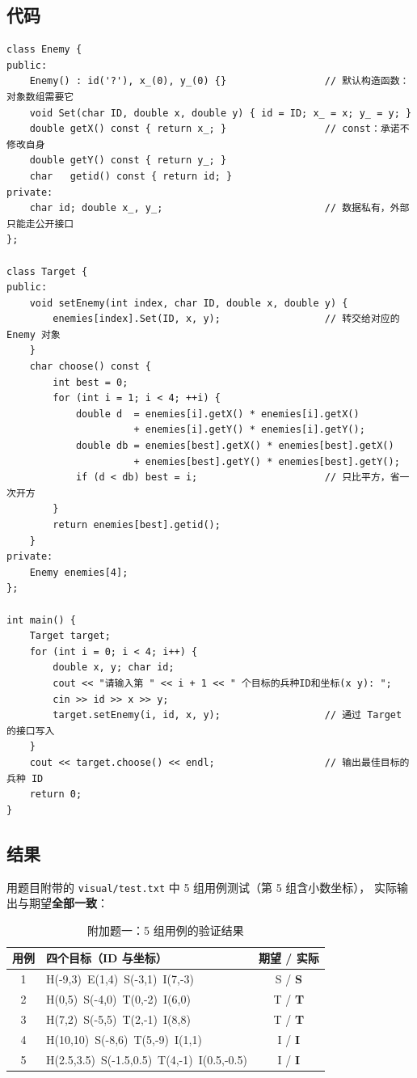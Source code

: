 \subsection{代码}
\begin{lstlisting}
class Enemy {
public:
    Enemy() : id('?'), x_(0), y_(0) {}                 // 默认构造函数：对象数组需要它
    void Set(char ID, double x, double y) { id = ID; x_ = x; y_ = y; }
    double getX() const { return x_; }                 // const：承诺不修改自身
    double getY() const { return y_; }
    char   getid() const { return id; }
private:
    char id; double x_, y_;                            // 数据私有，外部只能走公开接口
};

class Target {
public:
    void setEnemy(int index, char ID, double x, double y) {
        enemies[index].Set(ID, x, y);                  // 转交给对应的 Enemy 对象
    }
    char choose() const {
        int best = 0;
        for (int i = 1; i < 4; ++i) {
            double d  = enemies[i].getX() * enemies[i].getX()
                      + enemies[i].getY() * enemies[i].getY();
            double db = enemies[best].getX() * enemies[best].getX()
                      + enemies[best].getY() * enemies[best].getY();
            if (d < db) best = i;                      // 只比平方，省一次开方
        }
        return enemies[best].getid();
    }
private:
    Enemy enemies[4];
};

int main() {
    Target target;
    for (int i = 0; i < 4; i++) {
        double x, y; char id;
        cout << "请输入第 " << i + 1 << " 个目标的兵种ID和坐标(x y): ";
        cin >> id >> x >> y;
        target.setEnemy(i, id, x, y);                  // 通过 Target 的接口写入
    }
    cout << target.choose() << endl;                   // 输出最佳目标的兵种 ID
    return 0;
}
\end{lstlisting}

\subsection{结果}
用题目附带的 \texttt{visual/test.txt} 中 5 组用例测试（第 5 组含小数坐标），
实际输出与期望\textbf{全部一致}：

\begin{table}[h]\centering
  \caption{附加题一：5 组用例的验证结果}
  \begin{tabular}{clc}
    \toprule
    用例 & 四个目标（ID 与坐标） & 期望 / 实际 \\
    \midrule
    1 & H(-9,3)\ E(1,4)\ S(-3,1)\ I(7,-3) & S / \textbf{S} \\
    2 & H(0,5)\ S(-4,0)\ T(0,-2)\ I(6,0) & T / \textbf{T} \\
    3 & H(7,2)\ S(-5,5)\ T(2,-1)\ I(8,8) & T / \textbf{T} \\
    4 & H(10,10)\ S(-8,6)\ T(5,-9)\ I(1,1) & I / \textbf{I} \\
    5 & H(2.5,3.5)\ S(-1.5,0.5)\ T(4,-1)\ I(0.5,-0.5) & I / \textbf{I} \\
    \bottomrule
  \end{tabular}
\end{table}

